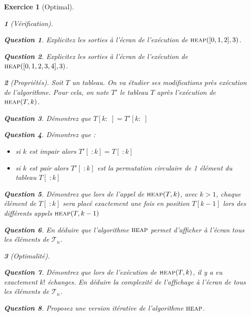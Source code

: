 \documentclass{article}
\theoremstyle{exostyle}
\newtheorem{exo}{Exercice}
\theoremstyle{partiestyle}
\newtheorem{partie}{}[exo]
\theoremstyle{questionstyle}
\newtheorem{questionpartie}{Question}[partie]
\begin{document}
\begin{exo}[Optimal]
\begin{partie}[Vérification]
        \begin{questionpartie}
            Explicitez les sorties à l'écran de l'exécution de $\textsc{heap}([0, 1, 2], 3)$.
        \end{questionpartie}
        \begin{questionpartie}
            Explicitez les sorties à l'écran de l'exécution de $\textsc{heap}([0, 1, 2, 3, 4], 3)$.
        \end{questionpartie}
    \end{partie}
    \begin{partie}[Propriétés]
        Soit $T$ un tableau. On va étudier ses modifications près exécution de l'algorithme. Pour cela, on note $T'$ le tableau $T$ après l'exécution de $\textsc{heap}(T, k)$.
            \begin{questionpartie}
                Démontrez que  $T[k:\;] = T'[k:\;]$
            \end{questionpartie}
        \begin{questionpartie}
                Démontrez que :
                \begin{itemize}
                    \item si $k$ est impair alors $T'[\;:k] = T[\;:k]$
                    \item si $k$ est pair alors $T'[\;:k]$ est la permutation circulaire de 1 élément du tableau $T[\;:k]$
            \end{itemize}
        \end{questionpartie}
        \begin{questionpartie}
            Démontrez que lors de l'appel de $\textsc{heap}(T, k)$, avec $k>1$, chaque élément de $T[\;:k]$ sera placé exactement une fois en position $T[k-1]$ lors des différents appels $\textsc{heap}(T, k-1)$
        \end{questionpartie}
        \begin{questionpartie}
            En déduire que l'algorithme $\textsc{heap}$ permet d'afficher à l'écran tous les éléments de $\mathcal{T}_n$.
        \end{questionpartie}
    \end{partie}
    \begin{partie}[Optimalité]
        \begin{questionpartie}
            Démontrez que lors de l'exécution de $\textsc{heap}(T, k)$, il y a eu exactement $k!$ échanges. En déduire la complexité de l'affichage à l'écran de tous les éléments de $\mathcal{T}_n$.
        \end{questionpartie}
        \begin{questionpartie}
            Proposez une version itérative de l'algorithme $\textsc{heap}$.
        \end{questionpartie}

    \end{partie}
\end{exo}
\end{document}
